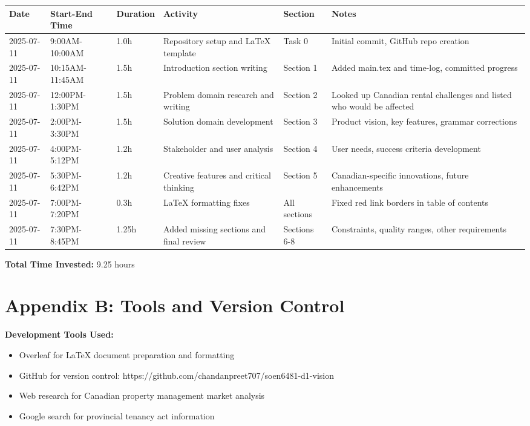 \documentclass[12pt]{article}
\begin{document}
\begin{longtable}{|p{2cm}|p{2.5cm}|p{1.5cm}|p{3.5cm}|p{2cm}|p{3cm}|}
\hline
\textbf{Date} & \textbf{Start-End Time} & \textbf{Duration} & \textbf{Activity} & \textbf{Section} & \textbf{Notes} \\
\hline
2025-07-11 & 9:00AM-10:00AM & 1.0h & Repository setup and LaTeX template & Task 0 & Initial commit, GitHub repo creation \\
\hline
2025-07-11 & 10:15AM-11:45AM & 1.5h & Introduction section writing & Section 1 & Added main.tex and time-log, committed progress \\
\hline
2025-07-11 & 12:00PM-1:30PM & 1.5h & Problem domain research and writing & Section 2 & Looked up Canadian rental challenges and listed who would be affected \\
\hline
2025-07-11 & 2:00PM-3:30PM & 1.5h & Solution domain development & Section 3 & Product vision, key features, grammar corrections \\
\hline
2025-07-11 & 4:00PM-5:12PM & 1.2h & Stakeholder and user analysis & Section 4 & User needs, success criteria development \\
\hline
2025-07-11 & 5:30PM-6:42PM & 1.2h & Creative features and critical thinking & Section 5 & Canadian-specific innovations, future enhancements \\
\hline
2025-07-11 & 7:00PM-7:20PM & 0.3h & LaTeX formatting fixes & All sections & Fixed red link borders in table of contents \\
\hline
2025-07-11 & 7:30PM-8:45PM & 1.25h & Added missing sections and final review & Sections 6-8 & Constraints, quality ranges, other requirements \\
\hline
\end{longtable}

\textbf{Total Time Invested:} 9.25 hours

\section*{Appendix B: Tools and Version Control}

\textbf{Development Tools Used:}
\begin{itemize}
    \item Overleaf for LaTeX document preparation and formatting
    \item GitHub for version control: https://github.com/chandanpreet707/soen6481-d1-vision
    \item Web research for Canadian property management market analysis
    \item Google search for provincial tenancy act information
\end{itemize}
\end{document}
